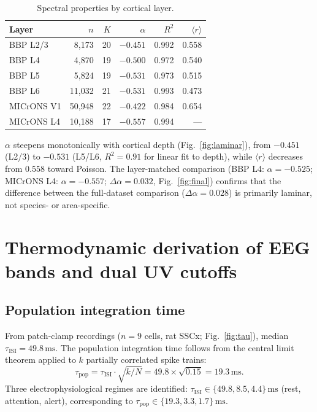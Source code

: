 \documentclass[aps,pre,twocolumn,showpacs,superscriptaddress,longbibliography]{revtex4-2}
\newcommand{\rGOE}{\langle r \rangle}
\newcommand{\kN}{k/N}
\newcommand{\taupop}{\tau_{\mathrm{pop}}}
\newcommand{\tauISI}{\tau_{\mathrm{ISI}}}
\begin{document}
\begin{table}[h]
\caption{\label{tab:layers}Spectral properties by cortical layer.}
\begin{ruledtabular}
\begin{tabular}{lrrrrr}
Layer & $n$ & $K$ & $\alpha$ & $R^2$ & $\rGOE$ \\
\hline
BBP L2/3    &  8{,}173 & 20 & $-0.451$ & 0.992 & 0.558 \\
BBP L4      &  4{,}870 & 19 & $-0.500$ & 0.972 & 0.540 \\
BBP L5      &  5{,}824 & 19 & $-0.531$ & 0.973 & 0.515 \\
BBP L6      & 11{,}032 & 21 & $-0.531$ & 0.993 & 0.473 \\
\hline
MICrONS V1  & 50{,}948 & 22 & $-0.422$ & 0.984 & 0.654 \\
MICrONS L4  & 10{,}188 & 17 & $-0.557$ & 0.994 & —    \\
\end{tabular}
\end{ruledtabular}
\end{table}

$\alpha$ steepens monotonically with cortical depth
(Fig.~\ref{fig:laminar}), from $-0.451$ (L2/3) to $-0.531$
(L5/L6, $R^2 = 0.91$ for linear fit to depth), while $\rGOE$
decreases from $0.558$ toward Poisson. The layer-matched
comparison (BBP L4: $\alpha=-0.525$; MICrONS L4: $\alpha=-0.557$;
$\Delta\alpha = 0.032$, Fig.~\ref{fig:final}) confirms that the
difference between the full-dataset comparison ($\Delta\alpha=0.028$)
is primarily laminar, not species- or area-specific.

\section{\label{sec:thermo}Thermodynamic derivation of EEG bands
         and dual UV cutoffs}

\subsection{Population integration time}

From patch-clamp recordings ($n=9$ cells, rat SSCx; 
Fig.~\ref{fig:tau}), median $\tauISI = 49.8\,\mathrm{ms}$.
The population integration time follows from the central limit
theorem applied to $k$ partially correlated spike trains:
\begin{equation}
  \taupop = \tauISI \cdot \sqrt{\kN} = 49.8\times\sqrt{0.15}
           = 19.3\,\mathrm{ms}.
  \label{eq:taupop}
\end{equation}
Three electrophysiological regimes are identified:
$\tauISI \in \{49.8, 8.5, 4.4\}\,\mathrm{ms}$ (rest, attention,
alert), corresponding to $\taupop \in \{19.3, 3.3, 1.7\}\,\mathrm{ms}$.
\end{document}

